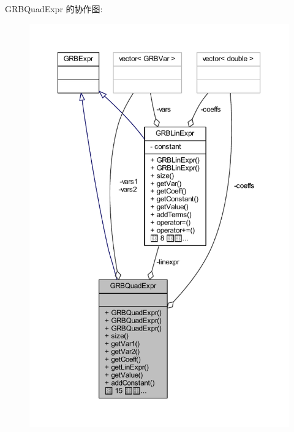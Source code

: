 G\+R\+B\+Quad\+Expr 的协作图\+:
\nopagebreak
\begin{figure}[H]
\begin{center}
\leavevmode
\includegraphics[width=350pt]{classGRBQuadExpr__coll__graph}
\end{center}
\end{figure}
